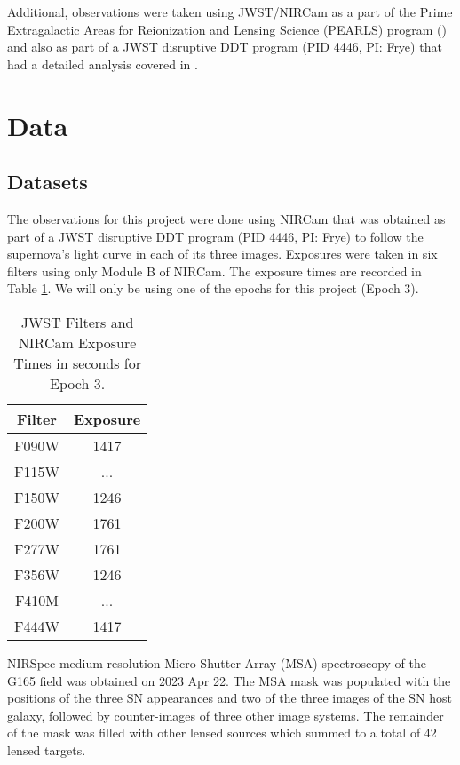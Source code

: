 \documentclass[twocolumn,linenumbers]{aastex631}
\begin{document}
Additional, observations were taken using JWST/NIRCam as a part of the Prime Extragalactic Areas for Reionization and Lensing Science (PEARLS) program (\cite{windhorst2022jwst}) and also as part of a JWST disruptive DDT program (PID 4446, PI: Frye) that had a detailed analysis covered in \cite{frye2023jwst}. 

\section{Data} \label{sec:data}

\subsection{Datasets} \label{sec:datasets}
The observations for this project were done using NIRCam that was obtained as part of a JWST disruptive DDT program (PID 4446, PI: Frye) to follow the supernova’s light curve in each of its three images. Exposures were taken in six filters using only Module B of NIRCam. The exposure times are recorded in Table \ref{tab:exptimes}. We will only be using one of the epochs for this project (Epoch 3).


\begin{table}[h!] 
    \centering
    \begin{tabular}{c|c}
        Filter & Exposure \\\hline
        F090W & 1417\\
        F115W & ...\\
        F150W & 1246\\
        F200W & 1761\\
        F277W & 1761\\
        F356W & 1246\\
        F410M & ...\\
        F444W & 1417\\
    \end{tabular}
    \caption{JWST Filters and NIRCam Exposure Times in seconds for Epoch 3.}
    \label{tab:exptimes}
\end{table}

NIRSpec medium-resolution Micro-Shutter Array (MSA) spectroscopy of the G165 field was obtained on 2023 Apr 22. The MSA mask was populated with the positions of the three SN appearances and two of the three images of the SN host galaxy, followed by counter-images of three other image systems. The remainder of the mask was filled with other lensed sources which summed to a total of 42 lensed targets. 
\end{document}
